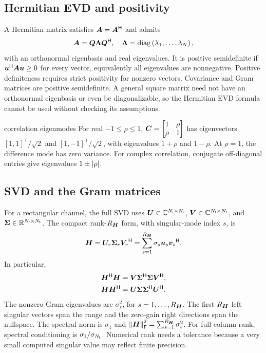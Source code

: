 \subsection{Hermitian EVD and positivity}
A Hermitian matrix satisfies $\bm{A}={\bm{A}}^{\mathsf{H}}$ and admits
\begin{equation}\label{eq:evd}
\bm{A}=\bm{Q}\bm{\Lambda}{\bm{Q}}^{\mathsf{H}},\quad
\bm{\Lambda}=\operatorname{diag}\left(\lambda_1,\ldots,\lambda_N\right),
\end{equation}
with an orthonormal eigenbasis and real eigenvalues. It is positive semidefinite if ${\bm{u}}^{\mathsf{H}}\bm{A}\bm{u}\geq0$ for every vector, equivalently all eigenvalues are nonnegative. Positive definiteness requires strict positivity for nonzero vectors. Covariance and Gram matrices are positive semidefinite. A general square matrix need not have an orthonormal eigenbasis or even be diagonalizable, so the Hermitian EVD formula cannot be used without checking its assumptions.

\begin{example}{correlation eigenmodes}
For real $-1\leq\rho\leq1$, $\bm{C}=\begin{bmatrix}1&\rho\\\rho&1\end{bmatrix}$ has eigenvectors $[1,1]^{\mathsf T}/\sqrt2$ and $[1,-1]^{\mathsf T}/\sqrt2$, with eigenvalues $1+\rho$ and $1-\rho$. At $\rho=1$, the difference mode has zero variance. For complex correlation, conjugate off-diagonal entries give eigenvalues $1\pm\left|\rho\right|$.
\end{example}

\subsection{SVD and the Gram matrices}
For a rectangular channel, the full SVD uses $\bm{U}\in\mathbb{C}^{N_{\mathsf{r}}\times N_{\mathsf{r}}}$, $\bm{V}\in\mathbb{C}^{N_{\mathsf{t}}\times N_{\mathsf{t}}}$, and $\bm{\Sigma}\in\mathbb{R}^{N_{\mathsf{r}}\times N_{\mathsf{t}}}$. The compact rank-$R_{\bm{H}}$ form, with singular-mode index $s$, is
\begin{equation}
\bm{H}=\bm{U}_r\bm{\Sigma}_r{\bm{V}_r}^{\mathsf{H}}
=\sum_{s=1}^{R_{\bm{H}}}\sigma_s\bm{u}_s{\bm{v}_s}^{\mathsf{H}}.
\end{equation}
In particular,
\begin{align}
{\bm{H}}^{\mathsf{H}}\bm{H}&=\bm{V}{\bm{\Sigma}}^{\mathsf{H}}\bm{\Sigma}{\bm{V}}^{\mathsf{H}},\\
\bm{H}{\bm{H}}^{\mathsf{H}}&=\bm{U}\bm{\Sigma}{\bm{\Sigma}}^{\mathsf{H}}{\bm{U}}^{\mathsf{H}}.
\end{align}
The nonzero Gram eigenvalues are $\sigma_s^2$, for $s=1,\ldots,R_{\bm{H}}$. The first $R_{\bm{H}}$ left singular vectors span the range and the zero-gain right directions span the nullspace. The spectral norm is $\sigma_1$ and $\left\|\bm{H}\right\|_{\mathsf{F}}^2=\sum_{s=1}^{R_{\bm{H}}}\sigma_s^2$. For full column rank, spectral conditioning is $\sigma_1/\sigma_{N_{\mathsf{t}}}$. Numerical rank needs a tolerance because a very small computed singular value may reflect finite precision.

